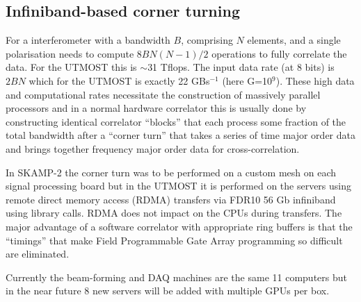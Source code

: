 \subsection{Infiniband-based corner turning}
For a interferometer with a bandwidth $B$, comprising $N$ elements, and a single polarisation needs to compute $8BN(N-1)/2$ operations to fully correlate the data. For the UTMOST this is $\sim$31 Tflops. The input data rate (at 8 bits) is $2BN$ which for the UTMOST is exactly 22 GBs$^{-1}$ (here G=10$^9$). These high data and computational rates necessitate the construction of massively parallel processors and in a normal hardware correlator this is usually done by constructing identical correlator ``blocks'' that each process some fraction of the total bandwidth after a ``corner turn'' that takes a series of time major order data and brings together frequency major order data for cross-correlation.

In SKAMP-2 the corner turn was to be performed on a custom mesh on each signal processing board but in the UTMOST it is performed on the servers using remote direct memory access (RDMA) transfers via FDR10 56 Gb infiniband using library calls. RDMA does not impact on the CPUs during transfers. The major advantage of a software correlator with appropriate ring buffers is that the ``timings'' that make Field Programmable Gate Array programming so difficult are eliminated.

Currently the beam-forming and DAQ machines are the same 11 computers but in the near future 8 new servers will be added with multiple GPUs per box.
